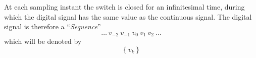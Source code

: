 At each sampling instant the switch is
closed for an infinitesimal time, during which the digital signal
has the same value as the continuous signal. The digital signal is
therefore a ``\emph{Sequence}'' \[\ldots\ v_{-2}\ v_{-1}\ v_{0}\
v_{1}\ v_{2}\ \ldots \] which will be denoted by
\[\left\{v_k\right\}\]
\endinput


